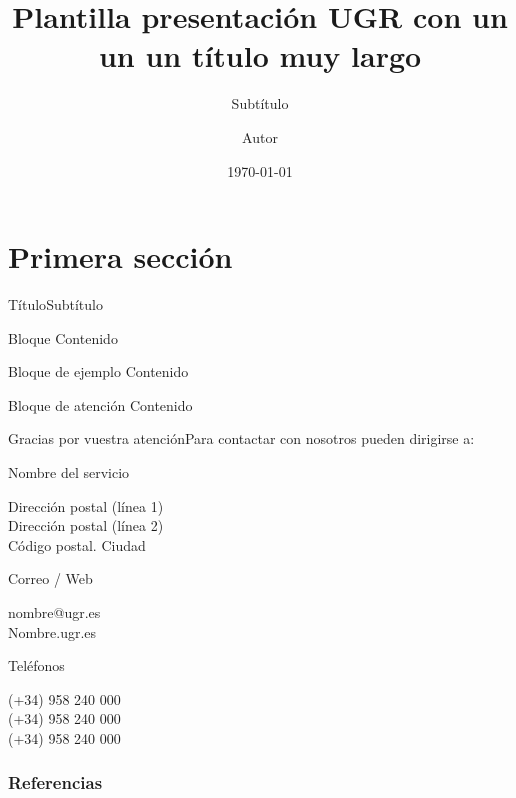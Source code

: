 \documentclass[spanish]{UGR-beamer}
\title{Plantilla presentación UGR con un un un  título muy largo}
\subtitle{Subtítulo}
\author{Autor}
\date{\today}
\newenvironment{iconBlock}[2]
{
  \begin{minipage}[t]{1.2em}
    \textcolor{ugr}{#1}
  \end{minipage}%
  \begin{minipage}[t]{\linewidth - 1.2em}
    {\large #2}\\\smallskip
  }
  {
  \end{minipage}
}
\begin{document}
\section{Primera sección}

\begin{frame}{Título}{Subtítulo}

  \begin{block}{Bloque}
    Contenido
  \end{block}

  \begin{exampleblock}{Bloque de ejemplo}
    Contenido
  \end{exampleblock}

  \begin{alertblock}{Bloque de atención}
    Contenido
  \end{alertblock}
\end{frame}

\begin{frame}{Gracias por vuestra atención}{Para contactar con nosotros pueden dirigirse a:}

  \begin{minipage}[t]{0.4\linewidth}
    \begin{iconBlock}{\faMapPin}{Nombre del servicio}
      \small
      Dirección postal (línea 1)\\
      Dirección postal (línea 2)\\
      Código postal. Ciudad
    \end{iconBlock}
  \end{minipage}\hfill%
  \begin{minipage}[t]{0.3\linewidth}
    \begin{iconBlock}{\faEnvelope}{Correo / Web}
      nombre@ugr.es\\
      Nombre.ugr.es\\
    \end{iconBlock}
  \end{minipage}\hfill%
  \begin{minipage}[t]{0.3\linewidth}
    \begin{iconBlock}{\faMobileScreenButton}{Teléfonos}
      \small
      (+34) 958 240 000\\
      (+34) 958 240 000\\
      (+34) 958 240 000
    \end{iconBlock}
  \end{minipage}%

\end{frame}


\begin{frame}
  \frametitle{Referencias}
  \nocite{CMT2023}
  
  
\end{frame}
\end{document}
